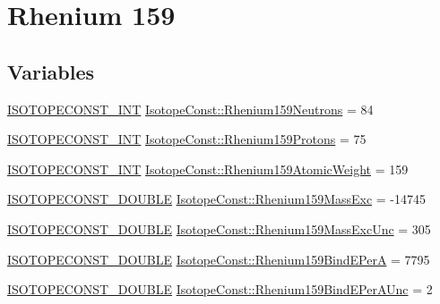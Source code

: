 \hypertarget{group___isotope_const-_rhenium-_re159}{}\section{Rhenium 159}
\label{group___isotope_const-_rhenium-_re159}
\subsection*{Variables}
\begin{DoxyCompactItemize}
\item 
\mbox{\hyperlink{group___isotope_const-_macros_ga5f18360b3e99483a35c32d789e62621c}{I\+S\+O\+T\+O\+P\+E\+C\+O\+N\+S\+T\+\_\+\+I\+NT}} \mbox{\hyperlink{group___isotope_const-_rhenium-_re159_gad1632569fda2a7efb8cc717202b8b507}{Isotope\+Const\+::\+Rhenium159\+Neutrons}} = 84
\item 
\mbox{\hyperlink{group___isotope_const-_macros_ga5f18360b3e99483a35c32d789e62621c}{I\+S\+O\+T\+O\+P\+E\+C\+O\+N\+S\+T\+\_\+\+I\+NT}} \mbox{\hyperlink{group___isotope_const-_rhenium-_re159_gad7e011778a1c152945033bc6889b5ec6}{Isotope\+Const\+::\+Rhenium159\+Protons}} = 75
\item 
\mbox{\hyperlink{group___isotope_const-_macros_ga5f18360b3e99483a35c32d789e62621c}{I\+S\+O\+T\+O\+P\+E\+C\+O\+N\+S\+T\+\_\+\+I\+NT}} \mbox{\hyperlink{group___isotope_const-_rhenium-_re159_ga209a93876516eb31c8928fde35528945}{Isotope\+Const\+::\+Rhenium159\+Atomic\+Weight}} = 159
\item 
\mbox{\hyperlink{group___isotope_const-_macros_ga8f45a7272ce02c0b4c65c44636ed719a}{I\+S\+O\+T\+O\+P\+E\+C\+O\+N\+S\+T\+\_\+\+D\+O\+U\+B\+LE}} \mbox{\hyperlink{group___isotope_const-_rhenium-_re159_gab5ec3f631fa1417c10af7a8ce599bf4b}{Isotope\+Const\+::\+Rhenium159\+Mass\+Exc}} = -\/14745
\item 
\mbox{\hyperlink{group___isotope_const-_macros_ga8f45a7272ce02c0b4c65c44636ed719a}{I\+S\+O\+T\+O\+P\+E\+C\+O\+N\+S\+T\+\_\+\+D\+O\+U\+B\+LE}} \mbox{\hyperlink{group___isotope_const-_rhenium-_re159_ga724f5299a905141cb4ecc0c8baa2f7b9}{Isotope\+Const\+::\+Rhenium159\+Mass\+Exc\+Unc}} = 305
\item 
\mbox{\hyperlink{group___isotope_const-_macros_ga8f45a7272ce02c0b4c65c44636ed719a}{I\+S\+O\+T\+O\+P\+E\+C\+O\+N\+S\+T\+\_\+\+D\+O\+U\+B\+LE}} \mbox{\hyperlink{group___isotope_const-_rhenium-_re159_ga835fce3b252ef785e08ebbd6979cb305}{Isotope\+Const\+::\+Rhenium159\+Bind\+E\+PerA}} = 7795
\item 
\mbox{\hyperlink{group___isotope_const-_macros_ga8f45a7272ce02c0b4c65c44636ed719a}{I\+S\+O\+T\+O\+P\+E\+C\+O\+N\+S\+T\+\_\+\+D\+O\+U\+B\+LE}} \mbox{\hyperlink{group___isotope_const-_rhenium-_re159_gaadcf9222a2f6fcaaf3655ac980124d27}{Isotope\+Const\+::\+Rhenium159\+Bind\+E\+Per\+A\+Unc}} = 2

\end{DoxyCompactItemize}
